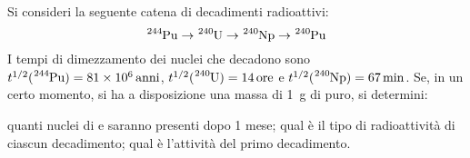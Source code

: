 \begin{Exercise}[title={Catena di decadimenti radioattivi ed equilibrio secolare}]
  Si consideri la seguente catena di decadimenti radioattivi:
  \[
  \ce{^{244}Pu} \to \ce{^{240}U} \to \ce{^{240}Np} \to \ce{^{240}Pu}
  \]
  I tempi di dimezzamento dei nuclei che decadono sono $t^{1/2}(\ce{^{244}Pu})=\SI{81e6}{anni}$,
  $t^{1/2}(\ce{^{240}U})=\SI{14}{ore}$ e $t^{1/2}(\ce{^{240}Np})=\SI{67}{min}$. Se, in un certo momento, si ha a disposizione
  una massa di \SI{1}{g} di  puro, si determini:

  \Question quanti nuclei di  e   saranno presenti dopo 1 mese;
  \Question qual \`e il tipo di radioattivit\`a di ciascun decadimento;
  \Question qual \`e l'attivit\`a del primo decadimento.
  
\end{Exercise}

